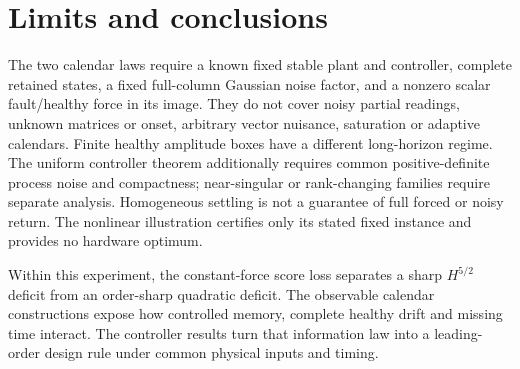 \documentclass[journal]{IEEEtran}
\begin{document}
\section{Limits and conclusions}\label{sf:conclusion}
The two calendar laws require a known fixed stable plant and controller,
complete retained states, a fixed full-column Gaussian noise factor, and a
nonzero scalar fault/healthy force in its image. They do not cover noisy
partial readings, unknown matrices or onset, arbitrary vector nuisance,
saturation or adaptive calendars. Finite healthy amplitude boxes have a
different long-horizon regime. The uniform controller theorem additionally
requires common positive-definite process noise and compactness; near-singular
or rank-changing families require separate analysis. Homogeneous settling is
not a guarantee of full forced or noisy return. The nonlinear illustration
certifies only its stated fixed instance and provides no hardware optimum.

Within this experiment, the constant-force score loss separates a sharp
$H^{5/2}$ deficit from an order-sharp quadratic deficit. The observable
calendar constructions expose how controlled memory, complete healthy drift
and missing time interact. The controller results turn that information law
into a leading-order design rule under common physical inputs and timing.

\appendices
\end{document}
